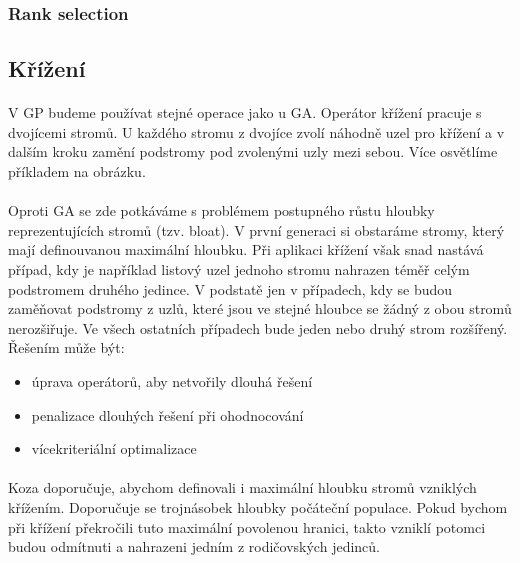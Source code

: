 \documentclass[bc,male,java,dept460]{diploma}		%
\begin{document}

\subsubsection*{Rank selection}



\subsection{Křížení}
\paragraph*{}
V GP budeme používat stejné operace jako u GA. Operátor křížení pracuje s dvojícemi stromů. U každého stromu z dvojíce zvolí náhodně uzel pro křížení a v dalším kroku zamění podstromy pod zvolenými uzly mezi sebou. Více osvětlíme příkladem na obrázku.


\paragraph*{}
Oproti GA se zde potkáváme s problémem postupného růstu hloubky reprezentujících stromů (tzv. bloat). V první generaci si obstaráme stromy, který mají definouvanou maximální hloubku. Při aplikaci křížení však snad nastává případ, kdy je například listový uzel jednoho stromu nahrazen téměř celým podstromem druhého jedince. V podstatě jen v případech, kdy se budou zaměňovat podstromy z uzlů, které jsou ve stejné hloubce se žádný z obou stromů nerozšiřuje. Ve všech ostatních případech bude jeden nebo druhý strom rozšířený. Řešením může být:
\begin{itemize}
\item úprava operátorů, aby netvořily dlouhá řešení
\item penalizace dlouhých řešení při ohodnocování
\item vícekriteriální optimalizace
\end{itemize}

\paragraph*{}
Koza doporučuje, abychom definovali i maximální hloubku stromů vzniklých křížením. Doporučuje se trojnásobek hloubky počáteční populace. Pokud bychom při křížení překročili tuto maximální povolenou hranici, takto vzniklí potomci budou odmítnuti a nahrazeni jedním z rodičovských jedinců.
\end{document}
